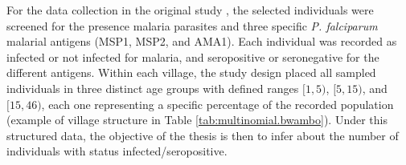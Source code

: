 For the data collection in the original study \cite{drakeley2005altitude}, the selected individuals were screened for the presence malaria parasites and three specific \textit{P. falciparum} malarial antigens (MSP1, MSP2, and AMA1).
Each individual was recorded as infected or not infected for malaria, and seropositive or seronegative for the different antigens.
Within each village, the study design placed all sampled individuals in three distinct age groups with defined ranges $[1,5)$, $[5,15)$, and $[15,46)$, each one representing a specific percentage of the %
recorded population (example of village structure in Table \ref{tab:multinomial.bwambo}).
Under this structured data, the objective of the thesis is then to infer about the number of individuals with status infected/seropositive.

